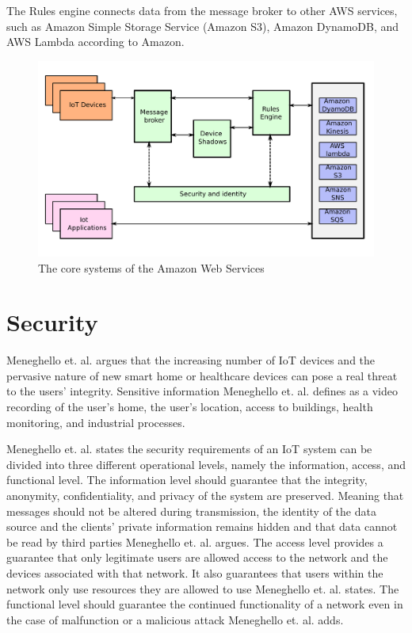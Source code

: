 The Rules engine connects data from the message broker to other AWS services, such as Amazon Simple Storage Service (Amazon S3), Amazon DynamoDB, and AWS Lambda according to Amazon.\cite{AWS2021}

\begin{figure}[H]
    \centering
    \includegraphics[width=\textwidth]{Pictures/aws.pdf} 
    \caption{The core systems of the Amazon Web Services}
    \label{diagram AWS}
\end{figure}

\section{Security}
Meneghello et. al. argues that the increasing number of IoT devices and the pervasive nature of new smart home or healthcare devices can pose a real threat to the users' integrity.
Sensitive information Meneghello et. al. defines as a video recording of the user's home, the user's location, access to buildings, health monitoring, and industrial processes.\cite{Meneghello2019}

Meneghello et. al. states the security requirements of an IoT system can be divided into three different operational levels, namely the information, access, and functional level.
The information level should guarantee that the integrity, anonymity, confidentiality, and privacy of the system are preserved. 
Meaning that messages should not be altered during transmission, the identity of the data source and the clients' private information remains hidden and that data cannot be read by third parties Meneghello et. al. argues.
The access level provides a guarantee that only legitimate users are allowed access to the network and the devices associated with that network. 
It also guarantees that users within the network only use resources they are allowed to use Meneghello et. al. states.
The functional level should guarantee the continued functionality of a network even in the case of malfunction or a malicious attack Meneghello et. al. adds.\cite{Meneghello2019}


